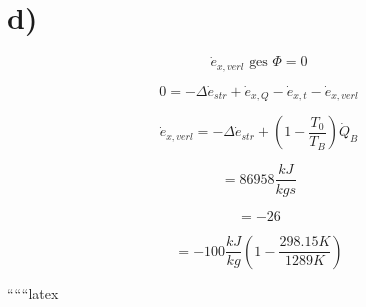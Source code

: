 

\section*{d)}

\[
\dot{e}_{x,verl} \text{ ges } \Phi = 0
\]

\[
0 = -\Delta \dot{e}_{str} + \dot{e}_{x,Q} - \dot{e}_{x,t} - \dot{e}_{x,verl}
\]

\[
\dot{e}_{x,verl} = -\Delta \dot{e}_{str} + \left( 1 - \frac{T_0}{T_B} \right) \dot{Q}_B
\]

\[
= 86958 \frac{kJ}{kg s}
\]

\[
= -26
\]

\[
= -100 \frac{kJ}{kg} \left( 1 - \frac{298.15 K}{1289 K} \right)
\]

``````latex